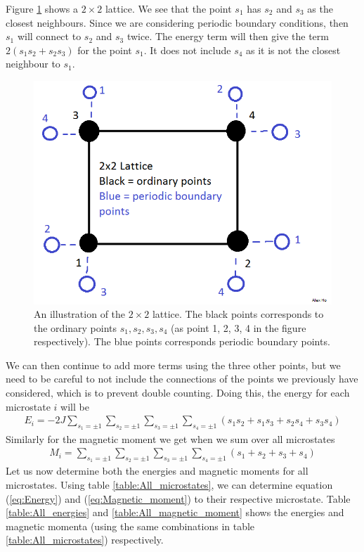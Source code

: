 \documentclass[12pt]{article}
\begin{document}
Figure \ref{fig:Lattice_illustration} shows a $2\times2$ lattice. We see that the point $s_1$ has $s_2$ and $s_3$ as the closest neighbours. Since we are considering periodic boundary conditions, then $s_1$ will connect to $s_2$ and $s_3$ twice. The energy term will then give the term $2(s_1s_2 + s_2s_3)$ for the point $s_1$. It does not include $s_4$ as it is not the closest neighbour to $s_1$. 
\begin{figure}[!h]
\centering
\includegraphics[width=\linewidth]{2x2_lattice_illustration.png}
\caption{An illustration of the $2\times 2$ lattice. The black points corresponds to the ordinary points $s_1, s_2, s_3, s_4$ (as point 1, 2, 3, 4 in the figure respectively). The blue points corresponds periodic boundary points.}
\label{fig:Lattice_illustration}
\end{figure}

We can then continue to add more terms using the three other points, but we need to be careful to not include the connections of the points we previously have considered, which is to prevent double counting. Doing this, the energy for each microstate $i$ will be
\begin{align}
E_i = -2J\displaystyle \sum_{s_1 = \pm1} \sum_{s_2 = \pm1} \sum_{s_3 = \pm1} \sum_{s_4 = \pm1}(s_1s_2 + s_1s_3 + s_2s_4 + s_3s_4)
\label{eq:Energy}
\end{align}
Similarly for the magnetic moment we get when we sum over all microstates 
\begin{align}
M_i = \displaystyle \sum_{s_1 = \pm1} \sum_{s_2 = \pm1} \sum_{s_3 = \pm1} \sum_{s_4 = \pm1} (s_1 + s_2 + s_3 + s_4)
\label{eq:Magnetic_moment}
\end{align}
Let us now determine both the energies and magnetic moments for all microstates. Using table \ref{table:All_microstates}, we can determine equation (\ref{eq:Energy}) and (\ref{eq:Magnetic_moment}) to their respective microstate. Table \ref{table:All_energies} and \ref{table:All_magnetic_moment} shows the energies and magnetic momenta (using the same combinations in table \ref{table:All_microstates}) respectively.
\end{document}
